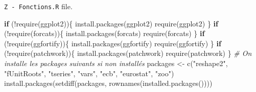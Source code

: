 \documentclass[
  11pt,
]{article}
\newenvironment{Shaded}{\begin{snugshade}}{\end{snugshade}}
\newcommand{\CommentTok}[1]{\textcolor[rgb]{0.56,0.35,0.01}{\textit{#1}}}
\newcommand{\ControlFlowTok}[1]{\textcolor[rgb]{0.13,0.29,0.53}{\textbf{#1}}}
\newcommand{\FunctionTok}[1]{\textcolor[rgb]{0.00,0.00,0.00}{#1}}
\newcommand{\NormalTok}[1]{#1}
\newcommand{\OtherTok}[1]{\textcolor[rgb]{0.56,0.35,0.01}{#1}}
\newcommand{\SpecialCharTok}[1]{\textcolor[rgb]{0.00,0.00,0.00}{#1}}
\newcommand{\StringTok}[1]{\textcolor[rgb]{0.31,0.60,0.02}{#1}}
\begin{document}
\texttt{Z\ -\ Fonctions.R} file.

\begin{Shaded}
\begin{Highlighting}[]
\ControlFlowTok{if}\NormalTok{ (}\SpecialCharTok{!}\FunctionTok{require}\NormalTok{(ggplot2))\{}
    \FunctionTok{install.packages}\NormalTok{(ggplot2)}
    \FunctionTok{require}\NormalTok{(ggplot2)}
\NormalTok{\}}
\ControlFlowTok{if}\NormalTok{ (}\SpecialCharTok{!}\FunctionTok{require}\NormalTok{(forcats))\{}
    \FunctionTok{install.packages}\NormalTok{(forcats)}
    \FunctionTok{require}\NormalTok{(forcats)}
\NormalTok{\}}
\ControlFlowTok{if}\NormalTok{ (}\SpecialCharTok{!}\FunctionTok{require}\NormalTok{(ggfortify))\{}
    \FunctionTok{install.packages}\NormalTok{(ggfortify)}
    \FunctionTok{require}\NormalTok{(ggfortify)}
\NormalTok{\}}
\ControlFlowTok{if}\NormalTok{ (}\SpecialCharTok{!}\FunctionTok{require}\NormalTok{(patchwork))\{}
    \FunctionTok{install.packages}\NormalTok{(patchwork)}
    \FunctionTok{require}\NormalTok{(patchwork)}
\NormalTok{\}}
\CommentTok{\# On installe les packages suivants si non installés}
\NormalTok{packages }\OtherTok{\textless{}{-}} \FunctionTok{c}\NormalTok{(}\StringTok{"reshape2"}\NormalTok{, }\StringTok{"fUnitRoots"}\NormalTok{, }\StringTok{"tseries"}\NormalTok{, }\StringTok{"vars"}\NormalTok{,}
              \StringTok{"ecb"}\NormalTok{, }\StringTok{"eurostat"}\NormalTok{, }\StringTok{"zoo"}\NormalTok{)}
\FunctionTok{install.packages}\NormalTok{(}\FunctionTok{setdiff}\NormalTok{(packages, }\FunctionTok{rownames}\NormalTok{(}\FunctionTok{installed.packages}\NormalTok{())))  }


\end{Highlighting}
\end{Shaded}
\end{document}

